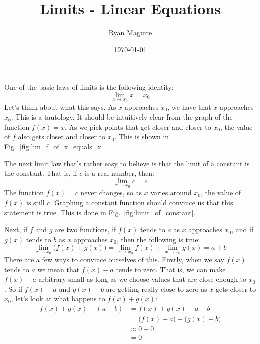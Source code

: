 \documentclass{article}
\title{Limits - Linear Equations}
\author{Ryan Maguire}
\date{\today}
\begin{document}
    \maketitle
    One of the basic laws of limits is the following identity:
    \begin{equation}
        \lim_{x\rightarrow{x_{0}}}x=x_{0}
    \end{equation}
    Let's think about what this says. As $x$ approaches $x_{0}$, we have that
    $x$ approaches $x_{0}$. This is a tautology. It should be intuitively clear
    from the graph of the function $f(x)=x$. As we pick points that get
    closer and closer to $x_{0}$, the value of $f$ also gets closer and closer
    to $x_{0}$. This is shown in Fig.~\ref{fig:lim_f_of_x_equals_x}.
    \par\hfill\par
    The next limit law that's rather easy to believe is that the limit of a
    constant is the constant. That is, if $c$ is a real number, then:
    \begin{equation}
        \lim_{x\rightarrow{x_{0}}}c=c
    \end{equation}
    The function $f(x)=c$ never changes, so as $x$ varies around $x_{0}$,
    the value of $f(x)$ is still $c$. Graphing a constant function should
    convince us that this statement is true. This is done in
    Fig.~\ref{fig:limit_of_constant}.
    \par\hfill\par
    Next, if $f$ and $g$ are two functions, if $f(x)$ tends to $a$ as
    $x$ approaches $x_{0}$, and if $g(x)$ tends to $b$ as $x$ approaches
    $x_{0}$, then the following is true:
    \begin{equation}
        \label{eqn:add_limit_law}%
        \lim_{x\rightarrow{x}_{0}}\big(f(x)+g(x)\big)
        =\lim_{x\rightarrow{x}_{0}}f(x)+
            \lim_{x\rightarrow{x}_{0}}g(x)
        =a+b
    \end{equation}
    There are a few ways to convince ourselves of this. Firstly, when we
    say $f(x)$ tends to $a$ we mean that $f(x)-a$ tends to zero. That is, we
    can make $f(x)-a$ arbitrary small as long as we choose values that are
    close enough to $x_{0}$. So if $f(x)-a$ and $g(x)-b$ are getting really
    close to zero as $x$ gets closer to $x_{0}$, let's look at what happens
    to $f(x)+g(x)$:
    \begin{align}
        f(x)+g(x)-(a+b)&=f(x)+g(x)-a-b\\
        &=\big(f(x)-a\big)+\big(g(x)-b\big)\\
        &\approx{0}+0\\
        &=0
    \end{align}
\end{document}
